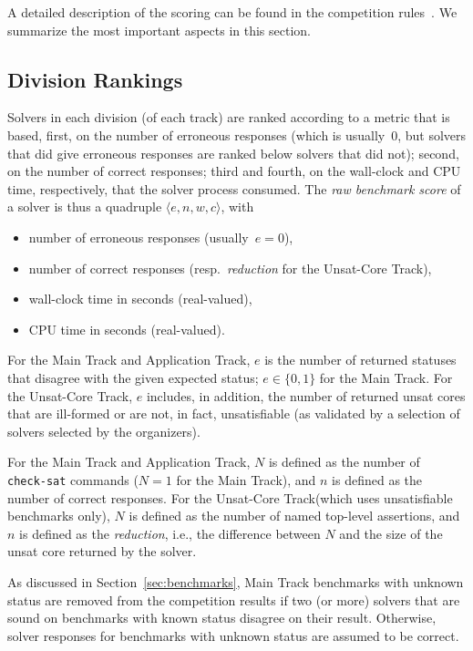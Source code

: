 \documentclass[dvipsnames,table,twoside,11pt]{article}
\newcommand{\maintrack}{Main Track\xspace}
\newcommand{\apptrack}{Application Track\xspace}
\newcommand{\ucoretrack}{Unsat-Core Track\xspace}
\begin{document}
A detailed description of the scoring can be found in the competition
rules~\cite{rules18}.  We summarize the most important aspects in this
section.

\subsection{Division Rankings}
\label{sec:scoring-division-rankings}

Solvers in each division (of each track) are ranked according to a
metric that is based, first, on the number of erroneous responses
(which is usually~0, but solvers that did give erroneous responses are
ranked below solvers that did not); second, on the number of correct
responses; third and fourth, on the wall-clock and CPU time,
respectively, that the solver process consumed.
%
The \emph{raw benchmark score} of a solver is thus a quadruple
$\langle e, n, w, c\rangle$, with
\begin{itemize}[noitemsep]
  \item {} number of erroneous responses (usually~$e = 0$),
  \item {} number of correct responses (resp.~\emph{reduction} for the \ucoretrack),
  \item {} wall-clock time in seconds (real-valued),
  \item {} CPU time in seconds (real-valued).
\end{itemize}
%
For the \maintrack and \apptrack, $e$ is the number of returned
statuses that disagree with the given expected status; $e \in \{0,1\}$
for the \maintrack.  For the \ucoretrack, $e$ includes, in addition,
the number of returned unsat cores that are ill-formed or are not, in
fact, unsatisfiable (as validated by a selection of solvers selected
by the organizers).

For the \maintrack and \apptrack, $N$ is defined as the number of {\tt
  check-sat} commands ($N=1$ for the \maintrack), and $n$ is defined
as the number of correct responses.  For the \ucoretrack (which uses
unsatisfiable benchmarks only), $N$ is defined as the number of named
top-level assertions, and~$n$ is defined as the \emph{reduction},
i.e., the difference between $N$ and the size of the unsat core
returned by the solver.

As discussed in Section~\ref{sec:benchmarks}, \maintrack benchmarks
with unknown status are removed from the competition results if two
(or more) solvers that are sound on benchmarks with known status
disagree on their result.  Otherwise, solver responses for benchmarks
with unknown status are assumed to be correct.
\end{document}
